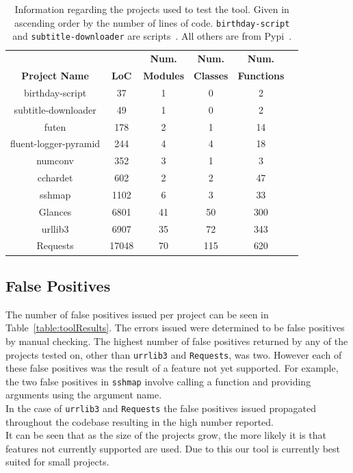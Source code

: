 \documentclass[12pt, titlepage]{article}
\begin{document}
	\begin{table}[bp]
	\centering
    \begin{tabular}{ | c | c | c | c | c | c |}
    \hline
     &  & \textbf{Num.} & \textbf{Num.}  & \textbf{Num.}  \\
    \textbf{Project Name} & \textbf{LoC} & \textbf{Modules} & \textbf{Classes} & \textbf{Functions} \\ \hline
    birthday-script & 37 & 1 & 0 & 2 \\ \hline
    subtitle-downloader & 49 & 1 & 0 & 2 \\ \hline
    futen & 178 & 2 & 1 & 14 \\ \hline
    fluent-logger-pyramid & 244 & 4 & 4 & 18 \\ \hline
    numconv & 352 & 3 & 1 & 3 \\ \hline
    cchardet & 602 & 2 & 2 & 47  \\ \hline
    sshmap & 1102 & 6 & 3 & 33 \\ \hline
    Glances & 6801 & 41 & 50 & 300 \\ \hline
    urllib3 & 6907 & 35 & 72 & 343 \\ \hline
    Requests & 17048 & 70 & 115 & 620 \\ \hline
    \end{tabular}
    \caption{Information regarding the projects used to test the tool. Given in ascending order by the number of lines of code. \texttt{birthday-script} and \texttt{subtitle-downloader} are scripts~\cite{pythonScripts}. All others are from Pypi~\cite{python3Projects}.}
	\label{table:toolTests}
    \end{table}
    


\subsection{False Positives}
The number of false positives issued per project can be seen in Table~\ref{table:toolResults}. The errors issued were determined to be false positives by manual checking. The highest number of false positives returned by any of the projects tested on, other than \texttt{urrlib3} and \texttt{Requests}, was two. However each of these false positives was the result of a feature not yet supported. For example, the two false positives in \texttt{sshmap} involve calling a function and providing arguments using the argument name. \\
\indent In the case of \texttt{urrlib3} and \texttt{Requests} the false positives issued propagated throughout the codebase resulting in the high number reported. \\
\indent It can be seen that as the size of the projects grow, the more likely it is that features not currently supported are used. Due to this our tool is currently best suited for small projects.
\end{document}
